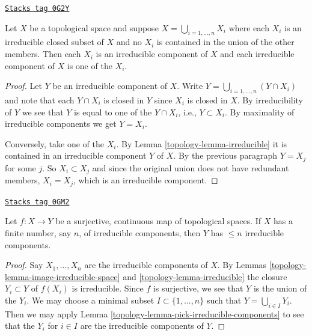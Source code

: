 \begin{lemma}
\label{topology-lemma-pick-irreducible-components}
\href{https://stacks.math.columbia.edu/tag/0G2Y}{\texttt{Stacks tag 0G2Y}}

Let $X$ be a topological space and suppose $X = \bigcup_{i = 1, \ldots, n} X_i$
where each $X_i$ is an irreducible closed subset of $X$ and no $X_i$
is contained in the union of the other members.  Then each $X_i$ is an
irreducible component of $X$ and each irreducible component of $X$
is one of the $X_i$.
\end{lemma}

\begin{proof}

Let $Y$ be an irreducible component of $X$. Write
$Y = \bigcup_{i = 1, \ldots, n} (Y \cap X_i)$
and note that each $Y \cap X_i$ is closed in $Y$ since $X_i$ is closed in $X$.
By irreducibility of $Y$ we see that $Y$ is equal to one of the $Y \cap X_i$,
i.e., $Y \subset X_i$.  By maximality of irreducible components we
get $Y = X_i$.

\medskip\noindent
Conversely, take one of the $X_i$. By Lemma \ref{topology-lemma-irreducible} it is
contained in an irreducible component $Y$ of $X$. By the previous paragraph
$Y = X_j$ for some $j$. So $X_i \subset X_j$ and since the original union does
not have redundant members, $X_i = X_j$, which is an irreducible component.
\end{proof}

\begin{lemma}
\label{topology-lemma-surjective-continuous-irreducible-components}
\href{https://stacks.math.columbia.edu/tag/0GM2}{\texttt{Stacks tag 0GM2}}

Let $f : X \to Y$ be a surjective, continuous map of topological spaces.
If $X$ has a finite number, say $n$, of irreducible components, then
$Y$ has $\leq n$ irreducible components.
\end{lemma}

\begin{proof}

Say $X_1, \ldots, X_n$ are the irreducible components of $X$.
By Lemmas \ref{topology-lemma-image-irreducible-space} and \ref{topology-lemma-irreducible}
the closure $Y_i \subset Y$ of $f(X_i)$ is irreducible.
Since $f$ is surjective, we see that $Y$ is the union of the $Y_i$.
We may choose a minimal subset $I \subset \{1, \ldots, n\}$
such that $Y = \bigcup_{i \in I} Y_i$. Then we may apply
Lemma \ref{topology-lemma-pick-irreducible-components} to see that the $Y_i$
for $i \in I$ are the irreducible components of $Y$.
\end{proof}

